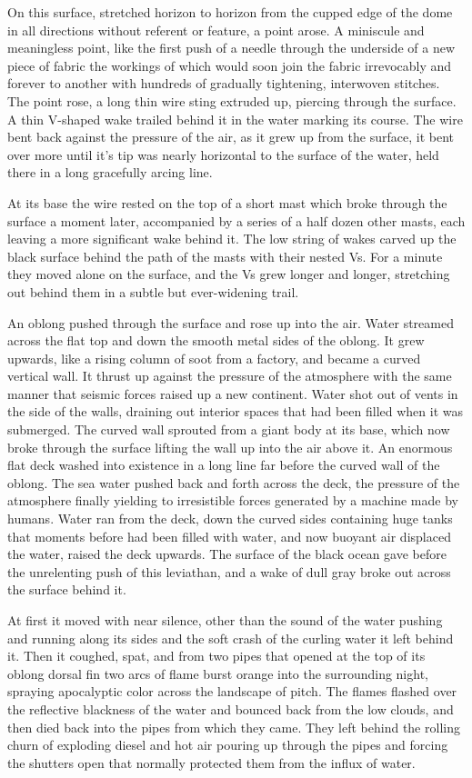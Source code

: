 \documentclass[]{article}
\begin{document}
On this surface, stretched horizon to horizon from the cupped edge of
the dome in all directions without referent or feature, a point arose. A
miniscule and meaningless point, like the first push of a needle through
the underside of a new piece of fabric the workings of which would soon
join the fabric irrevocably and forever to another with hundreds of
gradually tightening, interwoven stitches. The point rose, a long thin
wire sting extruded up, piercing through the surface. A thin V-shaped
wake trailed behind it in the water marking its course. The wire bent
back against the pressure of the air, as it grew up from the surface, it
bent over more until it's tip was nearly horizontal to the surface of
the water, held there in a long gracefully arcing line.

At its base the wire rested on the top of a short mast which broke
through the surface a moment later, accompanied by a series of a half
dozen other masts, each leaving a more significant wake behind it. The
low string of wakes carved up the black surface behind the path of the
masts with their nested Vs. For a minute they moved alone on the
surface, and the Vs grew longer and longer, stretching out behind them
in a subtle but ever-widening trail.

An oblong pushed through the surface and rose up into the air. Water
streamed across the flat top and down the smooth metal sides of the
oblong. It grew upwards, like a rising column of soot from a factory,
and became a curved vertical wall. It thrust up against the pressure of
the atmosphere with the same manner that seismic forces raised up a new
continent. Water shot out of vents in the side of the walls, draining
out interior spaces that had been filled when it was submerged. The
curved wall sprouted from a giant body at its base, which now broke
through the surface lifting the wall up into the air above it. An
enormous flat deck washed into existence in a long line far before the
curved wall of the oblong. The sea water pushed back and forth across
the deck, the pressure of the atmosphere finally yielding to
irresistible forces generated by a machine made by humans. Water ran
from the deck, down the curved sides containing huge tanks that moments
before had been filled with water, and now buoyant air displaced the
water, raised the deck upwards. The surface of the black ocean gave
before the unrelenting push of this leviathan, and a wake of dull gray
broke out across the surface behind it.

At first it moved with near silence, other than the sound of the water
pushing and running along its sides and the soft crash of the curling
water it left behind it. Then it coughed, spat, and from two pipes that
opened at the top of its oblong dorsal fin two arcs of flame burst
orange into the surrounding night, spraying apocalyptic color across the
landscape of pitch. The flames flashed over the reflective blackness of
the water and bounced back from the low clouds, and then died back into
the pipes from which they came. They left behind the rolling churn of
exploding diesel and hot air pouring up through the pipes and forcing
the shutters open that normally protected them from the influx of water.
\end{document}
